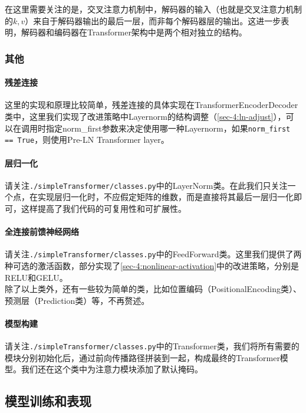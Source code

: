 在这里需要关注的是，交叉注意力机制中，解码器的输入（也就是交叉注意力机制的$k,v$）来自于解码器输出的最后一层，而非每个解码器层的输出。这进一步表明，解码器和编码器在Transformer架构中是两个相对独立的结构。

\subsubsection{其他}

\paragraph{残差连接}

这里的实现和原理比较简单，残差连接的具体实现在TransformerEncoderDecoder类中，这里我们实现了改进策略中Layernorm的结构调整（\ref{sec-4:ln-adjust}），可以在调用时指定norm\_first参数来决定使用哪一种Layernorm，如果\texttt{norm\_first == True}，则使用Pre-LN Transformer layer。

\paragraph{层归一化} 请关注\texttt{./simpleTransformer/classes.py}中的LayerNorm类。在此我们只关注一个点，在实现层归一化时，不应假定矩阵的维数，而是直接将其最后一层归一化即可，这样提高了我们代码的可复用性和可扩展性。

\paragraph{全连接前馈神经网络} 请关注\texttt{./simpleTransformer/classes.py}中的FeedForward类。这里我们提供了两种可选的激活函数，部分实现了\ref{sec-4:nonlinear-activation}中的改进策略，分别是RELU和GELU。
\\

除了以上类外，还有一些较为简单的类，比如位置编码（PositionalEncoding类）、预测层（Prediction类）等，不再赘述。

\paragraph{模型构建} 请关注\texttt{./simpleTransformer/classes.py}中的Transformer类，我们将所有需要的模块分别初始化后，通过前向传播路径拼装到一起，构成最终的Transformer模型。我们还在这个类中为注意力模块添加了默认掩码。

\subsection{模型训练和表现}

